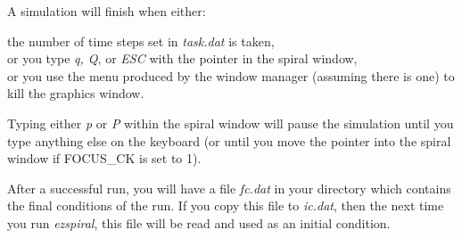 A simulation will finish when either:

\begin{list}{dummy}
{\partopsep=-10pt\parsep=-10pt\itemsep=0pt}
\item[~]the number of time steps set in {\em task.dat} is taken, \\
	or you type {\em q, Q}, or {\em ESC} with the pointer in the spiral 
        window, \\
	or you use the menu produced by the window manager (assuming there
        is one) to kill the graphics window.
\end{list}

Typing either {\em p} or {\em P} within the spiral window will pause
the simulation until you type anything else on the keyboard (or until
you move the pointer into the spiral window if {\sf FOCUS\_CK} is set
to 1).

After a successful run, you will have a file {\em fc.dat} in your
directory which contains the final conditions of the run. If you copy
this file to {\em ic.dat}, then the next time you run {\em ezspiral},
this file will be read and used as an initial condition.

